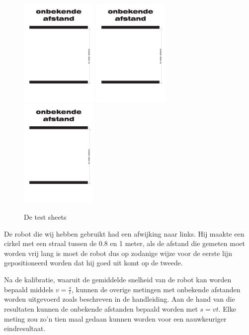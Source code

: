 \documentclass{report}
\begin{document}
\begin{figure}[H]
\includegraphics[width=0.33\textwidth,page=2]{test_sheets_A3}
\includegraphics[width=0.33\textwidth,page=1]{test_sheets_A3}
\includegraphics[width=0.33\textwidth,page=3]{test_sheets_A3}
\caption{De test sheets}
\label{fig:testSheets}
\end{figure}
De robot die wij hebben gebruikt had een afwijking naar links. Hij maakte een cirkel met een straal tussen de 0.8 en 1 meter, als de afstand die gemeten moet worden vrij lang is moet de robot dus op zodanige wijze voor de eerste lijn gepositioneerd worden dat hij goed uit komt op de tweede.

Na de kalibratie, waaruit de gemiddelde snelheid van de robot kan worden bepaald middels $v=\frac{s}{t}$, kunnen de overige metingen met onbekende afstanden worden uitgevoerd zoals beschreven in de handleiding. Aan de hand van die resultaten kunnen de onbekende afstanden bepaald worden met $s=vt$. Elke meting zou zo'n tien maal gedaan kunnen worden voor een nauwkeuriger eindresultaat.
\end{document}
